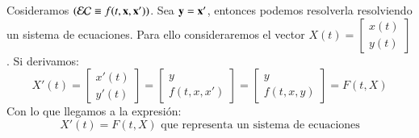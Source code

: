 \begin{eg}
    Cosideramos $(\mathcal{EC} \equiv f(t, \mathbf{x}, \mathbf{x}'))$. Sea $\mathbf{y} = \mathbf{x'}$, entonces podemos resolverla resolviendo un sistema de ecuaciones. Para ello consideraremos el vector $X(t) = \left[\begin{smallmatrix} x(t) \\ y(t) \end{smallmatrix}\right]$. Si derivamos:
    $$
        X'(t) = \left[\begin{matrix} x'(t) \\ y'(t) \end{matrix}\right] = \left[\begin{matrix} y \\ f(t, x, x') \end{matrix}\right]= \left[\begin{matrix} y \\ f(t, x, y) \end{matrix}\right] = F(t, X)
    $$
    Con lo que llegamos a la expresión:
    $$
        X'(t) = F(t, X) \text{ que representa un sistema de ecuaciones}
    $$

\end{eg}

